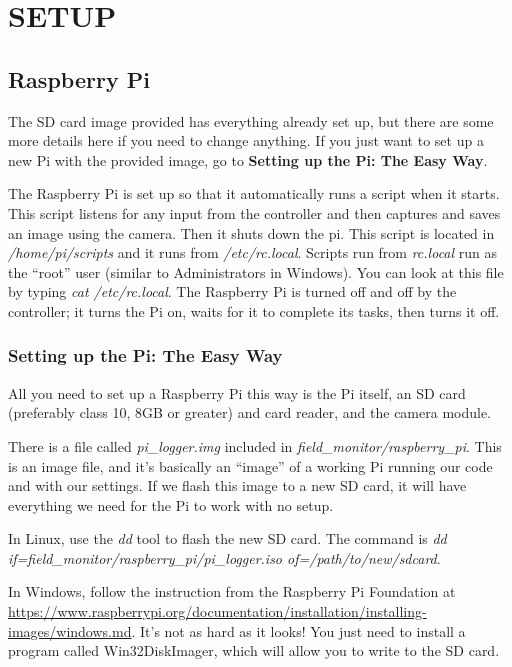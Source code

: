 \documentclass[10pt]{article}
\begin{document}
\section{SETUP}

\subsection{Raspberry Pi}
The SD card image provided has everything already set up, but there are some more details here if you need to change anything. If you just want to set up a new Pi with the
provided image, go to \textbf{Setting up the Pi: The Easy Way}.

The Raspberry Pi is set up so that it automatically runs a script when it starts. This script listens for any input from the controller and then captures and saves an image
using the camera. Then it shuts down the pi. This script is located in \textit{/home/pi/scripts} and it runs from \textit{/etc/rc.local}. Scripts run from \textit{rc.local}
run as the ``root'' user (similar to Administrators in Windows). You can look at this file by typing \textit{cat /etc/rc.local}. The Raspberry Pi is turned off and off
by the controller; it turns the Pi on, waits for it to complete its tasks, then turns it off.

\subsubsection{Setting up the Pi: The Easy Way}
All you need to set up a Raspberry Pi this way is the Pi itself, an SD card (preferably class 10, 8GB or greater) and card reader, and the camera module.

There is a file called \textit{pi\_logger.img} included in \textit{field\_monitor/raspberry\_pi}. This is an image file, and it's basically an ``image'' of a working Pi
running our code and with our settings. If we flash this image to a new SD card, it will have everything we need for the Pi to work with no setup. 

In Linux, use the \textit{dd} tool to flash the new SD card. The command is \textit{dd if=field\_monitor/raspberry\_pi/pi\_logger.iso of=/path/to/new/sdcard}. 

In Windows, follow the instruction from the Raspberry Pi Foundation at \url{https://www.raspberrypi.org/documentation/installation/installing-images/windows.md}. It's
not as hard as it looks! You just need to install a program called Win32DiskImager, which will allow you to write to the SD card.
\end{document}
